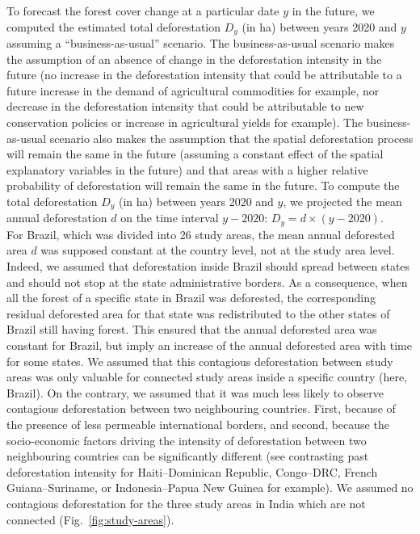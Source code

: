 \documentclass[
  12pt,
]{article}
\begin{document}
To forecast the forest cover change at a particular date \(y\) in the future, we computed the estimated total deforestation \(D_y\) (in ha) between years 2020 and \(y\) assuming a ``business-as-usual'' scenario. The business-as-usual scenario makes the assumption of an absence of change in the deforestation intensity in the future (no increase in the deforestation intensity that could be attributable to a future increase in the demand of agricultural commodities for example, nor decrease in the deforestation intensity that could be attributable to new conservation policies or increase in agricultural yields for example). The business-as-usual scenario also makes the assumption that the spatial deforestation process will remain the same in the future (assuming a constant effect of the spatial explanatory variables in the future) and that areas with a higher relative probability of deforestation will remain the same in the future. To compute the total deforestation \(D_y\) (in ha) between years 2020 and \(y\), we projected the mean annual deforestation \(d\) on the time interval \(y-2020\): \(D_y=d \times (y-2020)\).\\

For Brazil, which was divided into 26 study areas, the mean annual deforested area \(d\) was supposed constant at the country level, not at the study area level. Indeed, we assumed that deforestation inside Brazil should spread between states and should not stop at the state administrative borders. As a consequence, when all the forest of a specific state in Brazil was deforested, the corresponding residual deforested area for that state was redistributed to the other states of Brazil still having forest. This ensured that the annual deforested area was constant for Brazil, but imply an increase of the annual deforested area with time for some states. We assumed that this contagious deforestation between study areas was only valuable for connected study areas inside a specific country (here, Brazil). On the contrary, we assumed that it was much less likely to observe contagious deforestation between two neighbouring countries. First, because of the presence of less permeable international borders, and second, because the socio-economic factors driving the intensity of deforestation between two neighbouring countries can be significantly different (see contrasting past deforestation intensity for Haiti--Dominican Republic, Congo--DRC, French Guiana--Suriname, or Indonesia--Papua New Guinea for example). We assumed no contagious deforestation for the three study areas in India which are not connected (Fig.~\ref{fig:study-areas}).\\
\end{document}

